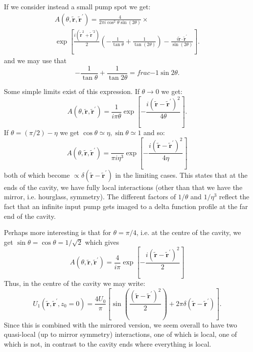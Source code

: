 \documentclass[twocolumn]{revtex4-1}
\renewcommand{\vec}[1]{\mathbf{#1}}
\newcommand{\tvr}{\tilde{\vec{r}}}
\newcommand{\tvrp}{\tilde{\vec{r}}^\prime}
\begin{document}
If we  consider instead a small pump spot we get:
\begin{multline}
  A(\theta,\tvr,\tvrp) = 
  \frac{4 }{2\pi i \cos^2\theta \sin(2\theta)} \times
  \\
  \exp\left[
    \frac{i(\tvr^2 + \tvr^{\prime 2})}{2}
    \left(-\frac{1}{\tan \theta} + \frac{1}{\tan(2\theta)} \right)
    - \frac{i \tvr\cdot\tvrp}{\sin(2\theta)} \right].
\end{multline}
and we may use that
\begin{displaymath}
  -\frac{1}{\tan \theta} + \frac{1}{\tan 2\theta }
    = frac{-1}{\sin 2 \theta}.
\end{displaymath}



Some simple limits exist of this expression.  If $\theta \to 0$ we
get:
\begin{displaymath}
  A(\theta,\tvr,\tvrp) = 
  \frac{1}{i \pi \theta} 
  \exp\left[
    -\frac{i(\tvr - \tvrp)^2}{4 \theta}
  \right].
\end{displaymath}
If $\theta = (\pi/2) - \eta$ we get
$\cos\theta \simeq \eta, \sin\theta \simeq 1$ and so:
\begin{displaymath}
  A(\theta,\tvr,\tvrp) = 
  \frac{ }{\pi i \eta^3} 
  \exp\left[
    - \frac{i(\tvr - \tvrp)^2}{4\eta} \right]
\end{displaymath}
both of which become $\propto \delta(\tvr-\tvrp)$ in the limiting
cases.  This states that at the ends of the cavity, we have fully
local interactions (other than that we have the mirror,
i.e. hourglass, symmetry).  The different factors of $1/\theta$ and
$1/\eta^3$ reflect the fact that an infinite input pump gets imaged to
a delta function profile at the far end of the cavity.

Perhaps more interesting is that for $\theta=\pi/4$, i.e. at the
centre of the cavity, we get $\sin\theta=\cos\theta=1/\sqrt{2}$
which gives
\begin{displaymath}
  A(\theta,\tvr,\tvrp) = 
  \frac{4}{i\pi } 
  \exp\left[
    -\frac{i(\tvr - \tvrp)^2}{2}
  \right]
\end{displaymath}
Thus, in the centre of the cavity we may write:
\begin{equation}
  \label{eq:13}
  U_1(\tvr, \tvrp, z_0=0) = \frac{4 U_0}{\pi} \left[
    \sin\left(\frac{(\tvr - \tvrp)^2}{2}\right)
    + 
    2\pi \delta(\tvr-\tvrp)
  \right].
\end{equation}
Since this is combined with the mirrored version, we seem overall to
have two quasi-local (up to mirror symmetry) interactions, one of
which is local, one of which is not, in contrast to the cavity ends
where everything is local.   
\end{document}
